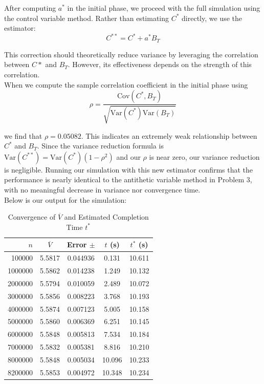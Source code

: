 \documentclass{report}
\begin{document}
After computing $a^*$ in the initial phase, we proceed with the full simulation using the control variable method. Rather than estimating $C^*$ directly, we use the estimator:
\[
C^{**}=C^* + a^*B_T
\]

This correction should theoretically reduce variance by leveraging the correlation between $C*$ and $B_T$. However, its effectiveness depends on the strength of this correlation. \\

When we compute the sample correlation coefficient in the initial phase using 
\[
\rho = \frac{\text{Cov}(C^*, B_T)}{\sqrt{\text{Var}(C^*) \text{Var}(B_T)}}
\]

we find that $\rho = 0.05082$. This indicates an extremely weak relationship between $C^*$ and $B_T$. Since the variance reduction formula is $\text{Var}(C^{**}) = \text{Var}(C^*)(1-\rho^2)$ and our $\rho$ is near zero, our variance reduction is negligible. Running our simulation with this new estimator confirms that the performance is nearly identical to the antithetic variable method in Problem 3, with no meaningful decrease in variance nor convergence time. \\

Below is our output for the simulation:
\begin{table}[H]
    \centering
    \caption{Convergence of $\overline{V}$ and Estimated Completion Time $t^*$}
    \label{tab:simulation_results}
    \begin{tabular}{rcccc}
        \hline
        $n$ & $\overline{V}$ & Error $\pm$ & $t$ (s) & $t^*$ (s) \\
        \hline
        100000  & 5.5817 & 0.044936 & 0.131  & 10.611 \\
        1000000 & 5.5862 & 0.014238 & 1.249  & 10.132 \\
        2000000 & 5.5794 & 0.010059 & 2.489  & 10.072 \\
        3000000 & 5.5856 & 0.008223 & 3.768  & 10.193 \\
        4000000 & 5.5874 & 0.007123 & 5.005  & 10.158 \\
        5000000 & 5.5860 & 0.006369 & 6.251  & 10.145 \\
        6000000 & 5.5848 & 0.005813 & 7.534  & 10.184 \\
        7000000 & 5.5832 & 0.005381 & 8.816  & 10.210 \\
        8000000 & 5.5848 & 0.005034 & 10.096 & 10.233 \\
        8200000 & 5.5853 & 0.004972 & 10.348 & 10.234 \\
        \hline
    \end{tabular}
\end{table}
\end{document}
